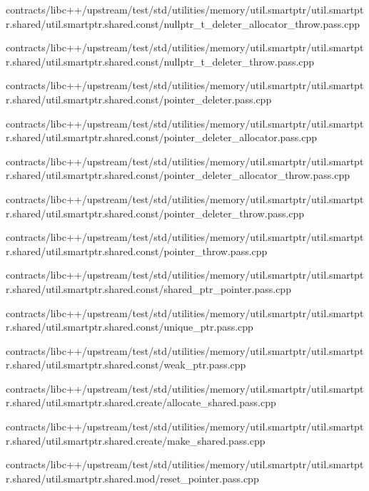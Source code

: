 \begin{DoxyCompactItemize}
contracts/libc++/upstream/test/std/utilities/memory/util.\+smartptr/util.\+smartptr.\+shared/util.\+smartptr.\+shared.\+const/nullptr\+\_\+t\+\_\+deleter\+\_\+allocator\+\_\+throw.\+pass.\+cpp\item 
contracts/libc++/upstream/test/std/utilities/memory/util.\+smartptr/util.\+smartptr.\+shared/util.\+smartptr.\+shared.\+const/nullptr\+\_\+t\+\_\+deleter\+\_\+throw.\+pass.\+cpp\item 
contracts/libc++/upstream/test/std/utilities/memory/util.\+smartptr/util.\+smartptr.\+shared/util.\+smartptr.\+shared.\+const/pointer\+\_\+deleter.\+pass.\+cpp\item 
contracts/libc++/upstream/test/std/utilities/memory/util.\+smartptr/util.\+smartptr.\+shared/util.\+smartptr.\+shared.\+const/pointer\+\_\+deleter\+\_\+allocator.\+pass.\+cpp\item 
contracts/libc++/upstream/test/std/utilities/memory/util.\+smartptr/util.\+smartptr.\+shared/util.\+smartptr.\+shared.\+const/pointer\+\_\+deleter\+\_\+allocator\+\_\+throw.\+pass.\+cpp\item 
contracts/libc++/upstream/test/std/utilities/memory/util.\+smartptr/util.\+smartptr.\+shared/util.\+smartptr.\+shared.\+const/pointer\+\_\+deleter\+\_\+throw.\+pass.\+cpp\item 
contracts/libc++/upstream/test/std/utilities/memory/util.\+smartptr/util.\+smartptr.\+shared/util.\+smartptr.\+shared.\+const/pointer\+\_\+throw.\+pass.\+cpp\item 
contracts/libc++/upstream/test/std/utilities/memory/util.\+smartptr/util.\+smartptr.\+shared/util.\+smartptr.\+shared.\+const/shared\+\_\+ptr\+\_\+pointer.\+pass.\+cpp\item 
contracts/libc++/upstream/test/std/utilities/memory/util.\+smartptr/util.\+smartptr.\+shared/util.\+smartptr.\+shared.\+const/unique\+\_\+ptr.\+pass.\+cpp\item 
contracts/libc++/upstream/test/std/utilities/memory/util.\+smartptr/util.\+smartptr.\+shared/util.\+smartptr.\+shared.\+const/weak\+\_\+ptr.\+pass.\+cpp\item 
contracts/libc++/upstream/test/std/utilities/memory/util.\+smartptr/util.\+smartptr.\+shared/util.\+smartptr.\+shared.\+create/allocate\+\_\+shared.\+pass.\+cpp\item 
contracts/libc++/upstream/test/std/utilities/memory/util.\+smartptr/util.\+smartptr.\+shared/util.\+smartptr.\+shared.\+create/make\+\_\+shared.\+pass.\+cpp\item 
contracts/libc++/upstream/test/std/utilities/memory/util.\+smartptr/util.\+smartptr.\+shared/util.\+smartptr.\+shared.\+mod/reset\+\_\+pointer.\+pass.\+cpp\item 

\end{DoxyCompactItemize}
